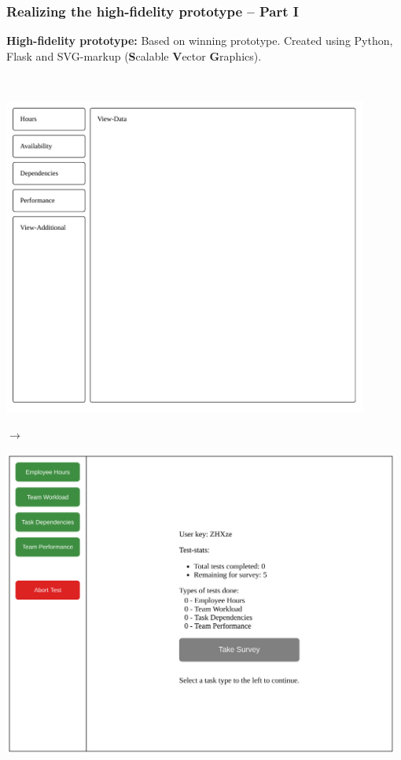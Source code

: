 \documentclass[xcolor=svgnames,10pt,aspectratio=1610]{beamer}
\begin{document}
\begin{frame}
  \frametitle{Realizing the high-fidelity prototype -- Part I}
  \begin{minipage}{\textwidth}
    \textbf{High-fidelity prototype:}
    Based on winning prototype. Created using Python, Flask and SVG-markup
    (\textbf{S}calable \textbf{V}ector \textbf{G}raphics).
  \end{minipage} \\

  \begin{minipage}{\textwidth}
    \begin{minipage}{\textwidth}
      \begin{minipage}{0.48\textwidth}
        \includegraphics[width=0.9\textwidth]{../msccls/ui14.pdf}
      \end{minipage}
      \begin{minipage}{0.02\textwidth}
        \hspace{-0.8cm}
        $\rightarrow$
      \end{minipage}
      \begin{minipage}{0.48\textwidth}
        \hspace{-0.7cm}
        \vspace{ 0.05cm}
        \includegraphics[width=0.98\textwidth]{../msccls/figures/captures/webapp_main_statistics.pdf}

\end{minipage}
\end{minipage}
\end{minipage}
\end{frame}
\end{document}
